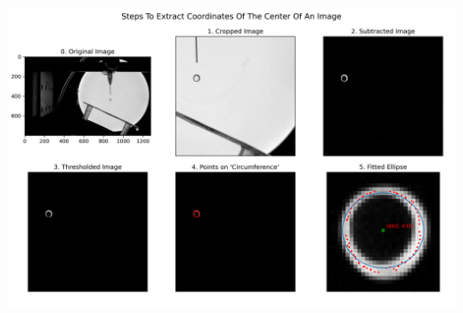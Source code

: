 \documentclass{article}
\begin{document}
\centering
\includegraphics[scale=0.5]{final.png}
\end{document}

